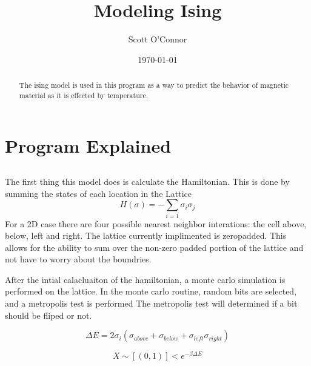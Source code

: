 \documentclass[]{article}
\begin{document}
\title{Modeling Ising}
\author{Scott O'Connor}
\date{\today} 
\maketitle

  \begin{abstract}
  The ising model is used in this program as a way to predict the behavior of magnetic material as it is effected by temperature. 
  \end{abstract}

\section{Program Explained}
  \subsection{}
  The first thing this model does is calculate the Hamiltonian.
  This is done by summing the states of each location in the Lattice
  \begin{equation}
      H(\sigma) = - \sum_{i=1} \sigma_i \sigma_j 
  \end{equation}
  For a 2D case there are four possible nearest neighbor interations: the cell above, below, left and right.
  The lattice currently implimented is zeropadded. This allows for the ability to sum over the non-zero padded portion of the lattice and not have to worry about the boundries. 

  After the intial calacluaiton of the hamiltonian, a monte carlo simulation is performed on the lattice. In the monte carlo routine, random bits are selected, and a metropolis test is performed
  The metropolis test will determined if a bit should be fliped or not.

  \begin{equation}
      \Delta E = 2 \sigma_i (\sigma_{above} + \sigma_{below} + \sigma_{left} \sigma_{right})
  \end{equation}

  \begin{equation}
    X \sim [(0,1)]< e^{-\beta \Delta E}
  \end{equation}
 
\end{document}
